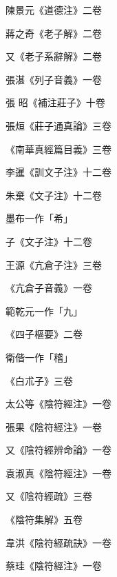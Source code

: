 \begin{pinyinscope}
 陳景元《道德注》二卷



 蔣之奇《老子解》二卷



 又《老子系辭解》二卷



 張湛《列子音義》一卷



 張
 昭《補注莊子》十卷



 張烜《莊子通真論》三卷



 《南華真經篇目義》三卷



 李暹《訓文子注》十二卷



 朱棄《文子注》十二卷



 墨布一作「希」



 子《文子注》十二卷



 王源《亢倉子注》三卷



 《亢倉子音義》一卷



 範乾元一作「九」



 《四子樞要》二卷



 衛偕一作「稽」



 《白朮子》三卷



 太公等《陰符經注》一卷



 張果《陰符經注》一卷



 又《陰符經辨命論》一卷



 袁淑真《陰符經注》一卷



 又《陰符經疏》三卷



 《陰符集解》五卷



 韋洪《陰符經疏訣》一卷



 蔡珪《陰符經注》一卷




\end{pinyinscope}
